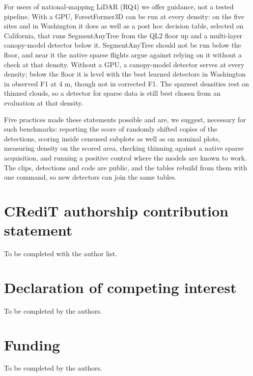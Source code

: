 \documentclass[preprint,12pt,authoryear,a4paper]{elsarticle}
\begin{document}
For users of national-mapping LiDAR (RQ4) we offer guidance, not a tested
pipeline. With a GPU, ForestFormer3D can be run at every density: on the five
sites and in Washington it does as well as a post hoc decision table, selected
on California, that runs SegmentAnyTree from the QL2 floor up and a multi-layer
canopy-model detector below it. SegmentAnyTree should not be run below the
floor, and near it the native sparse flights argue against relying on it without
a check at that density. Without a GPU, a canopy-model detector serves at every
density; below the floor it is level with the best learned detectors in
Washington in observed F1 at 4 m, though not in corrected F1. The sparsest
densities rest on thinned clouds, so a detector for sparse data is still best
chosen from an evaluation at that density.

Five practices made these statements possible and are, we suggest, necessary for
such benchmarks: reporting the score of randomly shifted copies of the
detections, scoring inside censused subplots as well as on nominal plots,
measuring density on the scored area, checking thinning against a native sparse
acquisition, and running a positive control where the models are known to work.
The clips, detections and code are public, and the tables rebuild from them with
one command, so new detectors can join the same tables.


\section*{CRediT authorship contribution statement}
To be completed with the author list.

\section*{Declaration of competing interest}
To be completed by the authors.

\section*{Funding}
To be completed by the authors.
\end{document}

